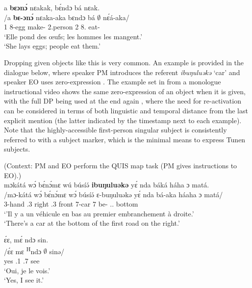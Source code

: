 \documentclass[output=paper,colorlinks,citecolor=brown
]{langscibook}
\begin{document}
\ea
\glll
{\db}a \textbf{bɛɔnɔ́} nɛakak, bɛ́ndɔ bá nɛak. \\
/a \textbf{bɛ-ɔnɔ́} nɛaka-aka bɛndɔ bá \textbf{$\emptyset$} nɛ́á-aka/ \\
{\db}1\SM{} 8-egg make-\DUR{} 2.person 2\SM{} 8.\OBJ{} eat-\DUR{} \\
\glt
`Elle pond des œufs; les hommes les mangent.' \\ `She lays eggs; people eat them.' \jambox*{[JO 1769] }

\z

Dropping given objects like this is very common. An example is provided in the dialogue below, where speaker PM introduces the referent \textit{ibuŋuluəkə} `car' and speaker EO uses zero-expression . The example set in  from a monologue instructional video shows the same zero-expression of an object when it is given, with the full DP being used at the end again , where the need for re-activation can be considered in terms of both linguistic and temporal distance from the last explicit mention (the latter indicated by the timestamp next to each example). Note that the highly-accessible first-person singular subject is consistently referred to with a subject marker, which is the minimal means to express Tunen subjects.\largerpage

\ea \label{carreference} (Context: PM and EO perform the QUIS map task (PM gives instructions to EO).) \\
\ea
\glll
{\db}mɔkátá wɔ́ bɛ́nɔ́mɛ wú búsíə́ \textbf{ibuŋuluəkə} yɛ́ nda báká háha ɔ matá. \\
/mɔ-kátá wɔ́ bɛ́nɔ́mɛ wɔ́ búsíə́ ɛ-buŋuluəkə yɛ́ nda bá-aka háaha ɔ matá/ \\
{\db}3-hand \ASS{}.3{} right \ASS{}.3{} front 7-car 7\SM{} \VEN{} be-\DUR{} \DEM.\PROX.\LOC{} \PREP{} bottom \\
\glt
`'Il y a un véhicule en bas au premier embranchement à droite.' \\ `There's a car at the bottom of the first road on the right.' \jambox*{[PM 671] }

\ex
\glll
{\db}ɛ́ɛ, mɛ́ ndɔ sin. \\
/ɛ́ɛ mɛ \textsuperscript{H}ndɔ $\emptyset$ sinə/ \\
{\db}yes \SM{}.1\SG{} \PRS{} \OBJ{}.7 see \\
\glt
`Oui, je le vois.' \\ `Yes, I see it.' \jambox*{[EO 672] }
\end{document}
